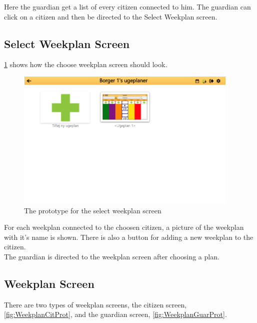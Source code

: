Here the guardian get a list of every citizen connected to him. The guardian can click on a citizen and then be directed to the Select Weekplan screen. 

\subsection*{Select Weekplan Screen}

\ref{fig:ChooseWeekProt} shows how the choose weekplan screen should look.
\begin{figure}[H]
    \begin{center}
        \includegraphics[width=0.95\textwidth]{figures/Prototypes/SelectWeekplanPrototype.png}
    \end{center}
    \caption{The prototype for the select weekplan screen}
    \label{fig:ChooseWeekProt}
\end{figure}

For each weekplan connected to the choosen citizen, a picture of the weekplan with it's name is shown. There is also a button for adding a new weekplan to the citizen.\\
The guardian is directed to the weekplan screen after choosing a plan.\\

\subsection*{Weekplan Screen}
There are two types of weekplan screens, the citizen screen, \ref{fig:WeekplanCitProt}, and the guardian screen, \ref{fig:WeekplanGuarProt}. 

